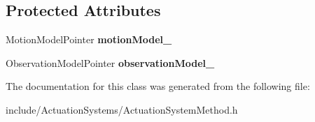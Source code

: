 \subsection*{\-Protected \-Attributes}
\begin{DoxyCompactItemize}
\item 
\hypertarget{class_actuation_system_method_a64ced37059fb1bb538f9b2a26ea018f4}{\-Motion\-Model\-Pointer {\bfseries motion\-Model\-\_\-}}\label{class_actuation_system_method_a64ced37059fb1bb538f9b2a26ea018f4}

\item 
\hypertarget{class_actuation_system_method_a30d8ec99ae45fd0c3233b85e9ef4093d}{\-Observation\-Model\-Pointer {\bfseries observation\-Model\-\_\-}}\label{class_actuation_system_method_a30d8ec99ae45fd0c3233b85e9ef4093d}

\end{DoxyCompactItemize}


\-The documentation for this class was generated from the following file\-:\begin{DoxyCompactItemize}
\item 
include/\-Actuation\-Systems/\-Actuation\-System\-Method.\-h\end{DoxyCompactItemize}
